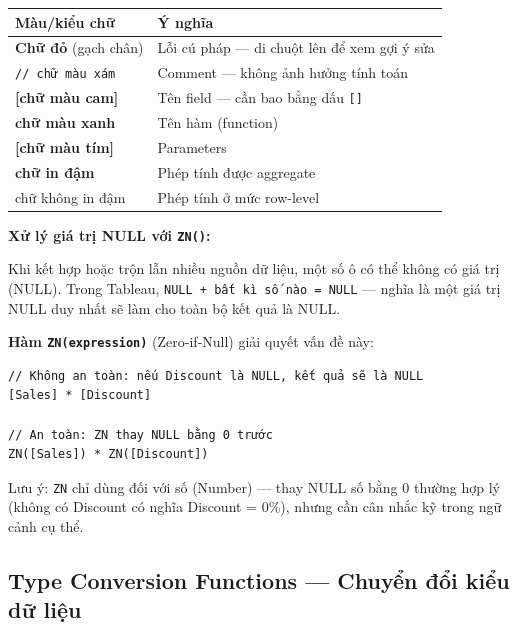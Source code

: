 \documentclass[12pt]{article}
\begin{document}
\begin{center}
\renewcommand{\arraystretch}{1.4}
\begin{tabularx}{\linewidth}{l X}
\toprule
\textbf{Màu/kiểu chữ} & \textbf{Ý nghĩa} \\
\midrule
\textbf{Chữ đỏ} (gạch chân) & Lỗi cú pháp --- di chuột lên để xem gợi ý sửa \\
\texttt{// chữ màu xám} & Comment --- không ảnh hưởng tính toán \\
\textbf{[chữ màu cam]} & Tên field --- cần bao bằng dấu \texttt{[]} \\
\textbf{chữ màu xanh} & Tên hàm (function) \\
\textbf{[chữ màu tím]} & Parameters \\
\textbf{chữ in đậm} & Phép tính được aggregate \\
chữ không in đậm & Phép tính ở mức row-level \\
\bottomrule
\end{tabularx}
\end{center}

\noindent \textbf{Xử lý giá trị NULL với \texttt{ZN()}:}

\noindent Khi kết hợp hoặc trộn lẫn nhiều nguồn dữ liệu, một số ô có thể không có giá trị (NULL). Trong Tableau, \texttt{NULL + bất kì số nào = NULL} --- nghĩa là một giá trị NULL duy nhất sẽ làm cho toàn bộ kết quả là NULL.

\noindent \textbf{Hàm \texttt{ZN(expression)}} (Zero-if-Null) giải quyết vấn đề này:

\begin{aivncodebox}[]
\begin{lstlisting}
// Không an toàn: nếu Discount là NULL, kết quả sẽ là NULL
[Sales] * [Discount]

// An toàn: ZN thay NULL bằng 0 trước
ZN([Sales]) * ZN([Discount])
\end{lstlisting}
\end{aivncodebox}

\noindent Lưu ý: \texttt{ZN} chỉ dùng đối với số (Number) --- thay NULL số bằng 0 thường hợp lý (không có Discount có nghĩa Discount = 0\%), nhưng cần cân nhắc kỹ trong ngữ cảnh cụ thể.

\subsection{Type Conversion Functions --- Chuyển đổi kiểu dữ liệu}
\end{document}
